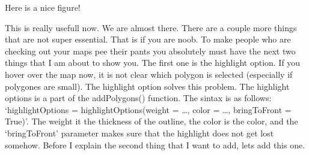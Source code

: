 \documentclass[]{book}
\newenvironment{Shaded}{\begin{snugshade}}{\end{snugshade}}
\newcommand{\CommentTok}[1]{\textcolor[rgb]{0.56,0.35,0.01}{\textit{#1}}}
\newcommand{\DataTypeTok}[1]{\textcolor[rgb]{0.13,0.29,0.53}{#1}}
\newcommand{\DecValTok}[1]{\textcolor[rgb]{0.00,0.00,0.81}{#1}}
\newcommand{\FloatTok}[1]{\textcolor[rgb]{0.00,0.00,0.81}{#1}}
\newcommand{\KeywordTok}[1]{\textcolor[rgb]{0.13,0.29,0.53}{\textbf{#1}}}
\newcommand{\NormalTok}[1]{#1}
\newcommand{\OperatorTok}[1]{\textcolor[rgb]{0.81,0.36,0.00}{\textbf{#1}}}
\newcommand{\StringTok}[1]{\textcolor[rgb]{0.31,0.60,0.02}{#1}}
\begin{document}
\begin{Shaded}
\end{Shaded}

\hypertarget{htmlwidget-9abfdf0d7c74a258635d}{}

\label{fig:nice-fig90}Here is a nice figure!

This is really usefull now. We are almost there. There are a couple more things that are not super essential. That is if you are noob. To make people who are checking out your maps pee their pants you absolutely must have the next two things that I am about to show you. The first one is the highlight option. If you hover over the map now, it is not clear which polygon is selected (especially if polygones are small). The highlight option solves this problem. The highlight options is a part of the addPolygons() function. The sintax is as follows: `highlightOptions = highlightOptions(weight = \ldots{}, color = \ldots{}, bringToFront = True)'. The weight it the thickness of the outline, the color is the color, and the `bringToFront' parameter makes sure that the highlight does not get lost somehow. Before I explain the second thing that I want to add, lets add this one.
\end{document}
